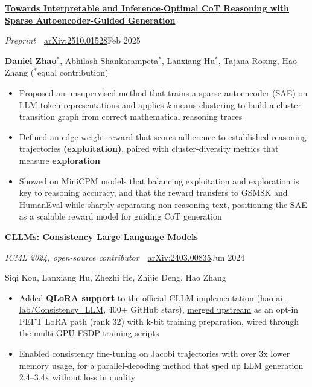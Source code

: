 \documentclass[letterpaper,11pt]{article}
\newcommand{\paper}[5]{%
  \needspace{6\baselineskip}%
  \textbf{\href{https://arxiv.org/abs/#2}{#1}}\par
  \textit{#3}\ \textbar\ \href{https://arxiv.org/abs/#2}{arXiv:#2}\hfill{#4}\par
  {\small #5\par}}
\newenvironment{bullets}
  {\begin{itemize}[leftmargin=1.2em, label=\textbullet, itemsep=0.5pt, parsep=0pt, topsep=2pt]}
  {\end{itemize}\vspace{5pt}}
\begin{document}
\paper{Towards Interpretable and Inference-Optimal CoT Reasoning with Sparse Autoencoder-Guided Generation}{2510.01528}
  {Preprint}{Feb 2025}
  {\textbf{Daniel Zhao}$^{*}$, Abhilash Shankarampeta$^{*}$, Lanxiang Hu$^{*}$, Tajana Rosing, Hao Zhang \quad ($^{*}$equal contribution)}
\begin{bullets}
  \item Proposed an unsupervised method that trains a sparse autoencoder (SAE) on LLM token representations and applies \textit{k}-means clustering to build a cluster-transition graph from correct mathematical reasoning traces
  \item Defined an edge-weight reward that scores adherence to established reasoning trajectories \textbf{(exploitation)}, paired with cluster-diversity metrics that measure \textbf{exploration}
  \item Showed on MiniCPM models that balancing exploitation and exploration is key to reasoning accuracy, and that the reward transfers to GSM8K and HumanEval while sharply separating non-reasoning text, positioning the SAE as a scalable reward model for guiding CoT generation
\end{bullets}

\paper{CLLMs: Consistency Large Language Models}{2403.00835}
  {ICML 2024, open-source contributor}{Jun 2024}
  {Siqi Kou, Lanxiang Hu, Zhezhi He, Zhijie Deng, Hao Zhang}
\begin{bullets}
  \item Added \textbf{QLoRA support} to the official CLLM implementation (\href{https://github.com/hao-ai-lab/Consistency_LLM}{hao-ai-lab/Consistency\_LLM}, 400+ GitHub stars), \href{https://github.com/hao-ai-lab/Consistency_LLM/pull/12}{merged upstream} as an opt-in PEFT LoRA path (rank 32) with k-bit training preparation, wired through the multi-GPU FSDP training scripts
  \item Enabled consistency fine-tuning on Jacobi trajectories with over 3x lower memory usage, for a parallel-decoding method that sped up LLM generation 2.4--3.4x without loss in quality
\end{bullets}
\end{document}
